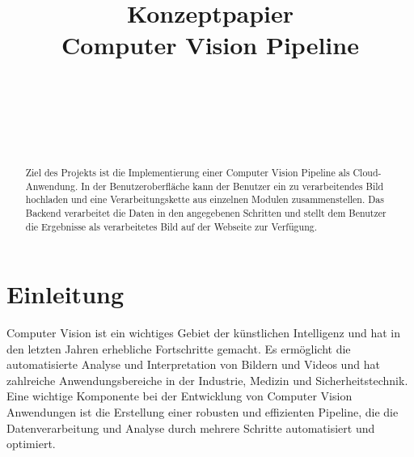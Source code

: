 \documentclass[conference]{IEEEtran}
\begin{document}
\title{Konzeptpapier
	\\Computer Vision Pipeline}

\author{

	\\
	
	\and
	
	\\
	
	\and
	
	\\
	
}


\maketitle

\begin{abstract}
	Ziel des Projekts ist die Implementierung einer Computer Vision Pipeline als Cloud-Anwendung. In der Benutzeroberfläche kann der Benutzer ein zu verarbeitendes Bild hochladen und eine Verarbeitungskette aus einzelnen Modulen zusammenstellen. Das Backend verarbeitet die Daten in den angegebenen Schritten und stellt dem Benutzer die Ergebnisse als verarbeitetes Bild auf der Webseite zur Verfügung.
\end{abstract}


\section{Einleitung}

Computer Vision ist ein wichtiges Gebiet der künstlichen Intelligenz und hat in den letzten Jahren erhebliche Fortschritte gemacht. Es ermöglicht die automatisierte Analyse und Interpretation von Bildern und Videos und hat zahlreiche Anwendungsbereiche in der Industrie, Medizin und Sicherheitstechnik. Eine wichtige Komponente bei der Entwicklung von Computer Vision Anwendungen ist die Erstellung einer robusten und effizienten Pipeline, die die Datenverarbeitung und Analyse durch mehrere Schritte automatisiert und optimiert.
\end{document}

